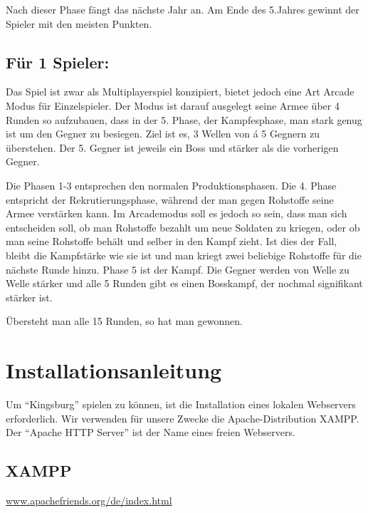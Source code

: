 \documentclass[a4paper]{scrreprt}
\begin{document}
Nach dieser Phase fängt das nächste Jahr an.
Am Ende des 5.Jahres gewinnt der Spieler mit den meisten Punkten.


\section{Für 1 Spieler:}

Das Spiel ist zwar als Multiplayerspiel konzipiert, bietet jedoch eine Art Arcade Modus für Einzelspieler.
Der Modus ist darauf ausgelegt seine Armee über 4 Runden so aufzubauen, dass in der 5. Phase, der Kampfesphase, man stark genug ist um den Gegner zu besiegen.
Ziel ist es, 3 Wellen von á 5 Gegnern zu überstehen.
Der 5. Gegner ist jeweils ein Boss und stärker als die vorherigen Gegner.

Die Phasen 1-3 entsprechen den normalen Produktionsphasen.
Die 4. Phase entspricht der Rekrutierungsphase, während der man gegen Rohstoffe seine Armee verstärken kann.
Im Arcademodus soll es jedoch so sein, dass man sich entscheiden soll, ob man Rohstoffe bezahlt um neue Soldaten zu kriegen, oder ob man seine Rohstoffe behält und selber in den Kampf zieht.
Ist dies der Fall, bleibt die Kampfstärke wie sie ist und man kriegt zwei beliebige Rohstoffe für die nächste Runde hinzu.
Phase 5 ist der Kampf. Die Gegner werden von Welle zu Welle stärker und alle 5 Runden gibt es einen Bosskampf, der nochmal signifikant stärker ist.

Übersteht man alle 15 Runden, so hat man gewonnen.

\chapter{Installationsanleitung}
Um "`Kingsburg"' spielen zu können, ist die Installation eines lokalen Webservers erforderlich. Wir verwenden für unsere Zwecke die Apache-Distribution XAMPP. Der "`Apache HTTP Server"' ist der Name eines freien Webservers. 

\section{XAMPP}
\href{https://www.apachefriends.org/de/index.html}{www.apachefriends.org/de/index.html}
\end{document}
